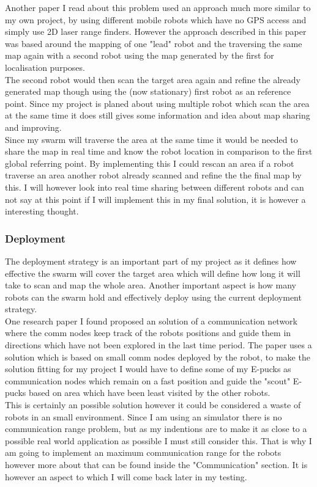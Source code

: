 \documentclass[10pt,a4paper]{article}
\begin{document}
\begin{flushleft}
Another paper I read about this problem used an approach much more similar to my own project, by using different mobile robots which have no GPS access and simply use 2D laser range finders. However the approach described in this paper was based around the mapping of one "lead" robot and the traversing the same map again with a second robot using the map generated by the first for localisation purposes.\\
The second robot would then scan the target area again and refine the already generated map though using the (now stationary) first robot as an reference point. Since my project is planed about using multiple robot which scan the area at the same time it does still gives some information and idea about map sharing and improving. \\
Since my swarm will traverse the area at the same time it would be needed to share the map in real time and know the robot location in comparison to the first global referring point.  By implementing this I could rescan an area if a robot traverse an area another robot already scanned and refine the the final map by this. I will however look into real time sharing between different robots and can not say at this point if I will implement this in my final solution, it is however a interesting thought.\\[3ex]

\subsubsection{Deployment}
The deployment strategy is an important part of my project as it defines how effective the swarm will cover the target area which will define how long it will take to scan and map the whole area. Another important aspect is how many robots can the swarm hold and effectively deploy using the current deployment strategy. \\ 
One research paper I found proposed an solution of a communication network where the comm nodes keep track of the robots positions and guide them in directions which have not been explored in the last time period\cite{Batalin2003Coverage}. The paper uses a solution which is based on small comm nodes deployed by the robot, to make the solution fitting for my project I would have to define some of my E-pucks as communication nodes which remain on a fast position and guide the "scout" E-pucks based on area which have been least visited by the other robots.\\ 
This is certainly an possible solution however it could be considered a waste of robots in an small environment. Since I am using an simulator there is no communication range problem, but as my indentions are to make it as close to a possible real world application as possible I must still consider this.
That is why I am going to implement an maximum communication range for the robots however more about that can be found inside the "Communication" section. It is however an aspect to which I will come back later in my testing.\\[3ex]


\end{flushleft}
\end{document}
